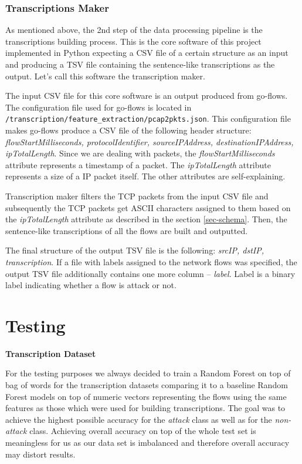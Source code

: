 \documentclass{article}
\begin{document}
\subsubsection{Transcriptions Maker}
As mentioned above, the 2nd step of the data processing pipeline is the transcriptions building process. This is the core software of this project implemented in Python expecting a CSV file of a certain structure as an input and producing a TSV file containing the sentence-like transcriptions as the output. Let's call this software the transcription maker.

The input CSV file for this core software is an output produced from go-flows. The configuration file used for go-flows is located in \verb|/transcription/feature_extraction/pcap2pkts.json|. This configuration file makes go-flows produce a CSV file of the following header structure: \textit{flowStartMilliseconds, protocolIdentifier, sourceIPAddress, destinationIPAddress, ipTotalLength}. Since we are dealing with packets, the \textit{flowStartMilliseconds} attribute represents a timestamp of a packet. The \textit{ipTotalLength} attribute represents a size of a IP packet itself. The other attributes are self-explaining.

Transcription maker filters the TCP packets from the input CSV file and subsequently the TCP packets get ASCII characters assigned to them based on the \textit{ipTotalLength} attribute as described in the section \ref{sec-schema}. Then, the sentence-like transcriptions of all the flows are built and outputted.

The final structure of the output TSV file is the following: \textit{srcIP, dstIP, transcription}. If a file with labels assigned to the network flows was specified, the output TSV file additionally contains one more column -- \textit{label}. Label is a binary label indicating whether a flow is attack or not.


\section{Testing}

\noindent\textbf{Transcription Dataset}

For the testing purposes we always decided to train a Random Forest on top of bag of words for the transcription datasets comparing it to a baseline Random Forest models on top of numeric vectors representing the flows using the same features as those which were used for building transcriptions. The goal was to achieve the highest possible accuracy for the \textit{attack} class as well as for the \textit{non-attack} class. Achieving overall accuracy on top of the whole test set is meaningless for us as our data set is imbalanced and therefore overall accuracy may distort results.
\end{document}

